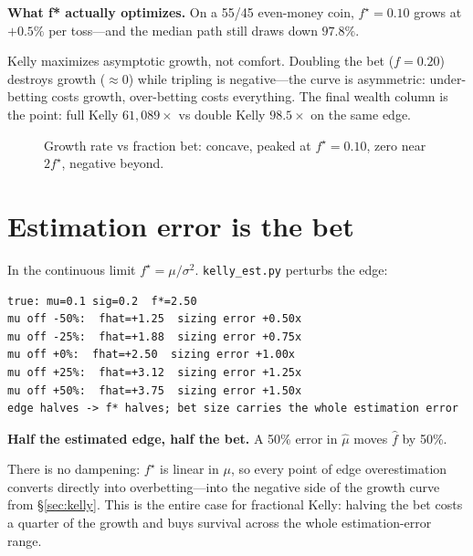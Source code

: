 \begin{example}\label{ex:kelly}
\textbf{What f* actually optimizes.} On a 55/45 even-money coin, $f^\star=0.10$ grows at
$+0.5\%$ per toss---and the median path still draws down $97.8\%$.
\begin{solution}
Kelly maximizes asymptotic growth, not comfort. Doubling the bet ($f=0.20$) destroys
growth ($\approx0$) while tripling is negative---the curve is asymmetric: under-betting
costs growth, over-betting costs everything. The final wealth column is the point:
full Kelly $61{,}089\times$ vs double Kelly $98.5\times$ on the same edge.
\end{solution}
\end{example}

\begin{figure}[htbp]\centering

\caption{Growth rate vs fraction bet: concave, peaked at $f^\star=0.10$, zero near
$2f^\star$, negative beyond.}
\label{fig:kgrowth}
\end{figure}

\section{Estimation error is the bet}\label{sec:kest}

In the continuous limit $f^\star=\mu/\sigma^2$. \texttt{kelly\_est.py} perturbs the edge:
\begin{lstlisting}[numbers=none]
true: mu=0.1 sig=0.2  f*=2.50
mu off -50%:  fhat=+1.25  sizing error +0.50x
mu off -25%:  fhat=+1.88  sizing error +0.75x
mu off +0%:  fhat=+2.50  sizing error +1.00x
mu off +25%:  fhat=+3.12  sizing error +1.25x
mu off +50%:  fhat=+3.75  sizing error +1.50x
edge halves -> f* halves; bet size carries the whole estimation error
\end{lstlisting}

\begin{example}\label{ex:kest}
\textbf{Half the estimated edge, half the bet.} A 50\% error in $\hat\mu$ moves $\hat f$
by 50\%.
\begin{solution}
There is no dampening: $f^\star$ is linear in $\mu$, so every point of edge overestimation
converts directly into overbetting---into the negative side of the growth curve from
\S\ref{sec:kelly}. This is the entire case for fractional Kelly: halving the bet costs
a quarter of the growth and buys survival across the whole estimation-error range.
\end{solution}
\end{example}

